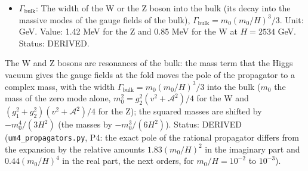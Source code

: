 \documentclass[
  10pt,
]{article}
\begin{document}
\begin{itemize}
  \(H\): The author's constant (an inverse length) that fixes the period
  \(\pi/(6H)\) of \(x_0\), the warp factor
  \(\mathrm{e}^{-2H\lvert\sigma\rvert}\) of the metric, the cosmological
  constant \(\Lambda = -21H^2\) and the tension
  \(\kappa\lambda_{\mathrm{F}} = 12H\) of the fold; in UM-4 a free
  parameter, bounded from below by the propagation of the gauge fields
  in the bulk. Unit: GeV (1/length). Value: \(H > 2534\) GeV, about 2.5
  TeV (from the invisible width of the Z boson). Status: AUTHOR.
\item
  \(\Gamma_{\mathrm{bulk}}\): The width of the W or the Z boson into the
  bulk (its decay into the massive modes of the gauge fields of the
  bulk), \(\Gamma_{\mathrm{bulk}} = m_0(m_0/H)^3/3\). Unit: GeV. Value:
  1.42 MeV for the Z and 0.85 MeV for the W at \(H = 2534\) GeV. Status:
  DERIVED.
\end{itemize}

The W and Z bosons are resonances of the bulk: the mass term that the
Higgs vacuum gives the gauge fields at the fold moves the pole of the
propagator to a complex mass, with the width
\(\Gamma_{\mathrm{bulk}} = m_0(m_0/H)^3/3\) into the bulk (\(m_0\) the
mass of the zero mode alone, \(m_0^2 = g_2^2(v^2 + \mathcal{A}^2)/4\)
for the W and \((g_1^2 + g_2^2)(v^2 + \mathcal{A}^2)/4\) for the Z); the
squared masses are shifted by \(-m_0^4/(3H^2)\) (the masses by
\(-m_0^3/(6H^2)\)). Status: DERIVED (\texttt{um4\_propagators.py}, P4:
the exact pole of the rational propagator differs from the expansion by
the relative amounts \(1.83(m_0/H)^2\) in the imaginary part and
\(0.44(m_0/H)^4\) in the real part, the next orders, for
\(m_0/H = 10^{-2}\) to \(10^{-3}\)).
\end{document}
